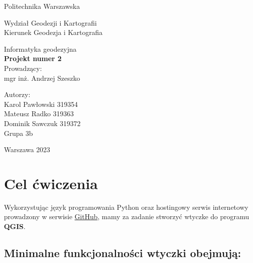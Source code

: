 \documentclass[a4paper,titleauthor]{mwart}
\begin{document}
\thispagestyle{empty}
\begin{center}{\sc \Large
Politechnika Warszawska\\
}\par\vspace{0.2cm}\par
{\large
Wydział Geodezji i Kartografii\\
Kierunek Geodezja i Kartografia

}\end{center}
\vspace{5cm}
\begin{center}

{\LARGE
 Informatyka geodezyjna\\
\textbf{Projekt numer 2}\\

Prowadzący:\\
mgr inż. Andrzej Szeszko\\

}
\end{center}
\vspace{4cm}
\begin{flushright}

{\large
Autorzy:\\
Karol Pawłowski 319354 \\
Mateusz Radko 319363\\
Dominik Sawczuk 319372\\

Grupa 3b\\
}
\end{flushright}
\vfill
\begin{center}
Warszawa 2023
\end{center}

\newpage

\tableofcontents
\newpage
\section{Cel ćwiczenia} 

Wykorzystując język programowania Python oraz hostingowy serwis internetowy prowadzony w serwisie \href{https://github.com/Grabarzd/Projekt_2.0.git}{GitHub}, mamy za zadanie stworzyć wtyczke do programu \textbf{QGIS}.\\
    \subsection{Minimalne funkcjonalności wtyczki obejmują:}
\end{document}
